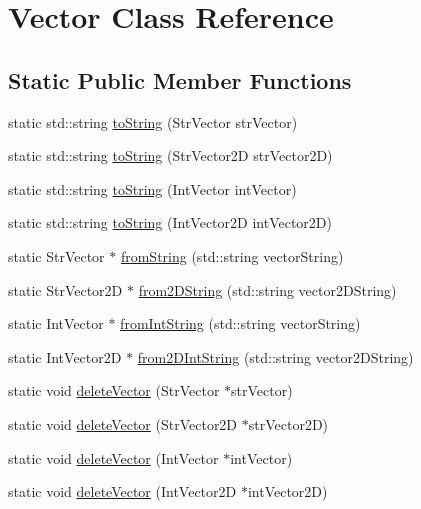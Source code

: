 \hypertarget{classVector}{
\section{\-Vector \-Class \-Reference}
\label{classVector}
}
\subsection*{\-Static \-Public \-Member \-Functions}
\begin{DoxyCompactItemize}
\item 
static std\-::string \hyperlink{classVector_aa392522386fbba694766e9c0958429df}{to\-String} (\-Str\-Vector str\-Vector)
\item 
static std\-::string \hyperlink{classVector_a7ae6a51d5bbbe9735ac17ea353760c2d}{to\-String} (\-Str\-Vector2\-D str\-Vector2\-D)
\item 
static std\-::string \hyperlink{classVector_af8693f4ca191f89ae486c215d2475bb8}{to\-String} (\-Int\-Vector int\-Vector)
\item 
static std\-::string \hyperlink{classVector_aa9f76615a779e0a0b2584168441af1d1}{to\-String} (\-Int\-Vector2\-D int\-Vector2\-D)
\item 
static \-Str\-Vector $\ast$ \hyperlink{classVector_a692c279796aaf703991d8f22ca784ac9}{from\-String} (std\-::string vector\-String)
\item 
static \-Str\-Vector2\-D $\ast$ \hyperlink{classVector_aec2cd0543c6f3a59a448b4d2e5f98a06}{from2\-D\-String} (std\-::string vector2\-D\-String)
\item 
static \-Int\-Vector $\ast$ \hyperlink{classVector_aeb2779e04d4b72c4fe7552137c3b27d7}{from\-Int\-String} (std\-::string vector\-String)
\item 
static \-Int\-Vector2\-D $\ast$ \hyperlink{classVector_a1a0a70e510d0f5afebe8943b12bb341f}{from2\-D\-Int\-String} (std\-::string vector2\-D\-String)
\item 
static void \hyperlink{classVector_a203b84bf61f6d9246f4bbd288daec685}{delete\-Vector} (\-Str\-Vector $\ast$str\-Vector)
\item 
static void \hyperlink{classVector_ac7107f26a72b04e12cb487e5ff464772}{delete\-Vector} (\-Str\-Vector2\-D $\ast$str\-Vector2\-D)
\item 
static void \hyperlink{classVector_ac95b48d002ebd1d40887b7b7d6b8fdff}{delete\-Vector} (\-Int\-Vector $\ast$int\-Vector)
\item 
static void \hyperlink{classVector_a9b146e458fab3206504897347fa81f78}{delete\-Vector} (\-Int\-Vector2\-D $\ast$int\-Vector2\-D)
\end{DoxyCompactItemize}


